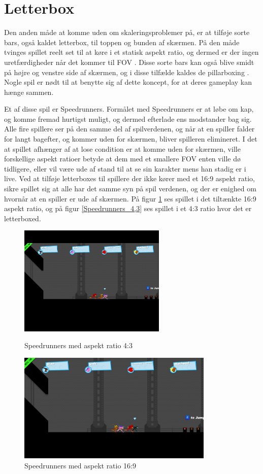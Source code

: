 \documentclass[Main.tex]{AspectRatio.tex}
\begin{document}
\section{Letterbox}

Den anden måde at komme uden om skaleringsproblemer på, er at tilføje sorte bars, også kaldet letterbox, til toppen og bunden af skærmen. På den måde tvinges spillet reelt set til at køre i et statisk aspekt ratio, og dermed er der ingen uretfærdigheder når det kommer til FOV \cite{computerhope}. Disse sorte bars kan også blive smidt på højre og venstre side af skærmen, og i disse tilfælde kaldes de pillarboxing \cite{Apple}. Nogle spil er nødt til at benytte sig af dette koncept, for at deres gameplay kan hænge sammen.

Et af disse spil er Speedrunners. Formålet med Speedrunners er at løbe om kap, og komme fremad hurtigst muligt, og dermed efterlade ens modstander bag sig. Alle fire spillere ser på den samme del af spilverdenen, og når at en spiller falder for langt bagefter, og kommer uden for skærmen, bliver spilleren elimineret. I det at spillet afhænger af at lose condition er at komme uden for skærmen, ville forskellige aspekt ratioer betyde at dem med et smallere FOV enten ville dø tidligere, eller vil være ude af stand til at se sin karakter mens han stadig er i live. Ved at tilføje letterboxes til spillere der ikke kører med et 16:9 aspekt ratio, sikre spillet sig at alle har det samme syn på spil verdenen, og der er enighed om hvornår at en spiller er ude af skærmen. På figur \ref{Speedrunners_16,9} ses spillet i det tiltænkte 16:9 aspekt ratio, og på figur \ref{Speedrunners_4,3} ses spillet i et 4:3 ratio hvor det er letterboxed.

\begin{figure}[h]
\centering
\parbox{7cm}{
\includegraphics[width = 7cm]{billeder/Speedrunners_4,3}
\caption{Speedrunners med aspekt ratio 4:3}    
\label{Speedrunners_4,3}}
\qquad
\begin{minipage}{9.33cm}
\includegraphics[width = 9.33cm]{billeder/Speedrunners_16,9}
\caption{Speedrunners med aspekt ratio 16:9}    
\label{Speedrunners_16,9}
\end{minipage}
\end{figure}
\end{document}

